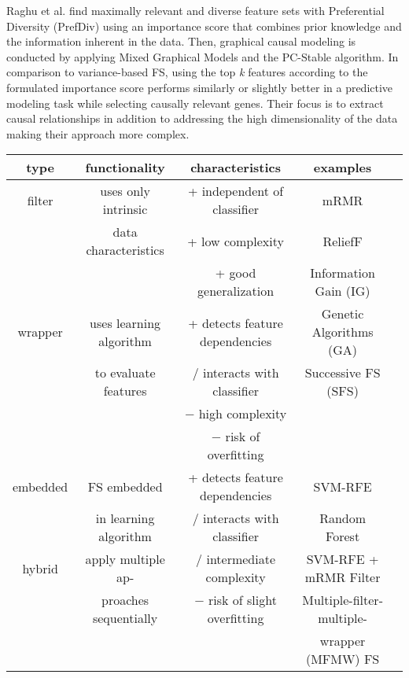 Raghu et al. find maximally relevant and diverse feature sets with Preferential Diversity (PrefDiv) using an importance score that combines prior knowledge and the information inherent in the data\cite{raghu2017integrated}.
Then, graphical causal modeling is conducted by applying Mixed Graphical Models and the PC-Stable algorithm. 
In comparison to variance-based FS, using the top \emph{k} features according to the formulated importance score performs similarly or slightly better in a predictive modeling task while selecting causally relevant genes.
Their focus is to extract causal relationships in addition to addressing the high dimensionality of the data making their approach more complex.


\begin{table}[h!]
\centering
\hspace*{-1cm}\begin{tabular}{ | c | c | c | c | c | }
\hline
  type & functionality & characteristics & examples\\ \hline
  filter & uses only intrinsic & + independent of classifier & mRMR\cite{ding2005minimum}\\ 
  & data characteristics & + low complexity & ReliefF\cite{kononenko1994estimating}\\ 
  & & + good generalization & Information Gain (IG) \\\hline
  
  wrapper & uses learning algorithm & + detects feature dependencies & Genetic Algorithms (GA)\cite{ooi2003genetic}\\
  & to evaluate features & / interacts with classifier & Successive FS (SFS)\cite{sharma2012top}\\
  & & $-$ high complexity &\\
  & & $-$ risk of overfitting &\\\hline
  
  embedded & FS embedded & + detects feature dependencies & SVM-RFE\cite{guyon2002gene}\\ 
  & in learning algorithm & / interacts with classifier & Random Forest\cite{diaz2006gene}\\\hline
  
  hybrid & apply multiple ap- & / intermediate complexity & SVM-RFE + mRMR Filter\cite{mundra2010svm}\\ 
  & proaches sequentially & $-$ risk of slight overfitting & Multiple-filter-multiple- \\
  & &  & wrapper (MFMW) FS\cite{leung2010multiple}\\\hline
  

\end{tabular}
\end{table}
